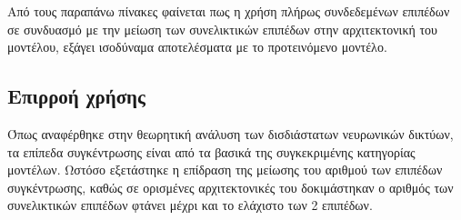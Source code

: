 Από τους παραπάνω πίνακες φαίνεται πως η χρήση πλήρως συνδεδεμένων επιπέδων σε συνδυασμό με την μείωση των συνελικτικών επιπέδων στην αρχιτεκτονική του μοντέλου, εξάγει ισοδύναμα αποτελέσματα με το προτεινόμενο μοντέλο.

\subsection{Επιρροή χρήσης }
Όπως αναφέρθηκε στην θεωρητική ανάλυση των δισδιάστατων νευρωνικών δικτύων, τα επίπεδα συγκέντρωσης είναι από τα βασικά της συγκεκριμένης κατηγορίας μοντέλων. Ωστόσο εξετάστηκε η επίδραση της μείωσης του αριθμού των επιπέδων συγκέντρωσης, καθώς σε ορισμένες αρχιτεκτονικές του δοκιμάστηκαν ο αριθμός των συνελικτικών επιπέδων φτάνει μέχρι και το ελάχιστο των 2 επιπέδων.

